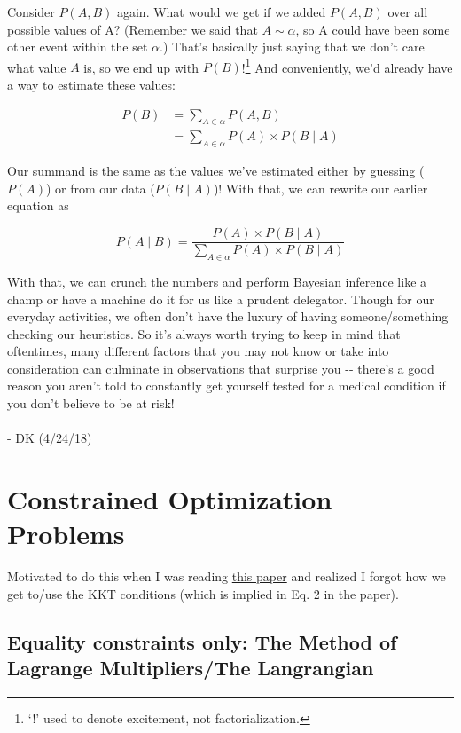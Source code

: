 \documentclass[letterpaper,12pt]{report}
\begin{document}
Consider \(P(A,B)\) again. What would we get if we added \(P(A,B)\) over
all possible values of A? (Remember we said that \(A \sim \alpha\), so A
could have been some other event within the set \(\alpha\).) That's
basically just saying that we don't care what value \(A\) is, so we end
up with \(P(B)\)!\footnote{
  `!' used to denote excitement, not factorialization.
  }
And conveniently, we'd already have a way to estimate these values:

\[\begin{split} P(B) &= \sum_{A \in \alpha} P(A,B) \\
                     &= \sum_{A \in \alpha} P(A) \times P(B \mid A)          \end{split}\]

Our summand is the same as the values we've estimated either by guessing
(\(P(A)\)) or from our data (\(P(B \mid A)\))! With that, we can rewrite
our earlier equation as

\[ P(A \mid B) = \frac{P(A) \times P(B \mid A)} {\sum_{A \in \alpha} P(A) \times P(B \mid A)} \]

With that, we can crunch the numbers and perform Bayesian inference like
a champ or have a machine do it for us like a prudent delegator. Though
for our everyday activities, we often don't have the luxury of having
someone/something checking our heuristics. So it's always worth trying
to keep in mind that oftentimes, many different factors that you may not
know or take into consideration can culminate in observations that
surprise you -\/- there's a good reason you aren't told to constantly
get yourself tested for a medical condition if you don't believe to be
at risk!
\\
\\
- DK (4/24/18)

\newpage

\chapter{Constrained Optimization
Problems}\label{constrained-optimization-problems}

Motivated to do this when I was reading
\href{https://arxiv.org/pdf/1606.05579.pdf}{this paper} and realized I
forgot how we get to/use the KKT conditions (which is implied in Eq. 2
in the paper).

\section{Equality constraints only: The Method of Lagrange
Multipliers/The
Langrangian}\label{equality-constraints-only-the-method-of-lagrange-multipliersthe-langrangian}
\end{document}
